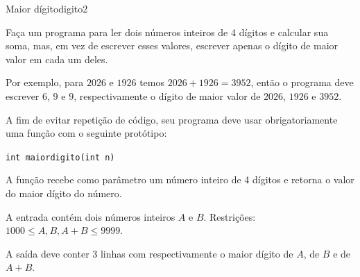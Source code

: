\documentclass[12pt,a4paper,oneside]{article}
\begin{document}
\begin{problem}{Maior dígito}{digito}{2}

Faça um programa para ler dois números inteiros de 4 dígitos e calcular sua soma, mas, em vez de escrever esses valores, escrever apenas o dígito de maior valor em cada um deles.

Por exemplo, para $2026$ e $1926$ temos $2026 + 1926 = 3952$, então o programa deve escrever $6$, $9$ e $9$,
respectivamente o dígito de maior valor de $2026$, $1926$ e $3952$.

A fim de evitar repetição de código, seu programa deve usar obrigatoriamente uma função com o seguinte protótipo:

\texttt{\textcolor{Mulberry}{int} maiordigito(\textcolor{Mulberry}{int} n)}

A função recebe como parâmetro um número inteiro de 4 dígitos e retorna o valor do maior dígito do número.

%

\InputFile

A entrada contém dois números inteiros $A$ e $B$. Restrições: $1000 \leq A, B, A+B \leq 9999$.

\OutputFile

A saída deve conter 3 linhas com respectivamente o maior dígito de $A$, de $B$ e de $A+B$.


\Example

\begin{example}
%
\end{example}

\begin{example}
%
\end{example}

\begin{example}
%
\end{example}


\end{problem}
\end{document}
